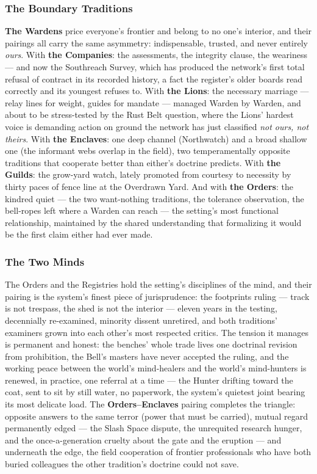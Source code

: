 \subsubsection{The Boundary Traditions}

\textbf{The Wardens} price everyone's frontier and belong to no one's interior, and their pairings all carry the same asymmetry: indispensable, trusted, and never entirely \textit{ours}. With \textbf{the Companies}: the assessments, the integrity clause, the weariness --- and now the Southreach Survey, which has produced the network's first total refusal of contract in its recorded history, a fact the register's older boards read correctly and its youngest refuses to. With \textbf{the Lions}: the necessary marriage --- relay lines for weight, guides for mandate --- managed Warden by Warden, and about to be stress-tested by the Rust Belt question, where the Lions' hardest voice is demanding action on ground the network has just classified \textit{not ours, not theirs}. With \textbf{the Enclaves}: one deep channel (Northwatch) and a broad shallow one (the informant webs overlap in the field), two temperamentally opposite traditions that cooperate better than either's doctrine predicts. With \textbf{the Guilds}: the grow-yard watch, lately promoted from courtesy to necessity by thirty paces of fence line at the Overdrawn Yard. And with \textbf{the Orders}: the kindred quiet --- the two want-nothing traditions, the tolerance observation, the bell-ropes left where a Warden can reach --- the setting's most functional relationship, maintained by the shared understanding that formalizing it would be the first claim either had ever made.

\subsubsection{The Two Minds}

The Orders and the Registries hold the setting's disciplines of the mind, and their pairing is the system's finest piece of jurisprudence: the footprints ruling --- track is not trespass, the shed is not the interior --- eleven years in the testing, decennially re-examined, minority dissent unretired, and both traditions' examiners grown into each other's most respected critics. The tension it manages is permanent and honest: the benches' whole trade lives one doctrinal revision from prohibition, the Bell's masters have never accepted the ruling, and the working peace between the world's mind-healers and the world's mind-hunters is renewed, in practice, one referral at a time --- the Hunter drifting toward the coat, sent to sit by still water, no paperwork, the system's quietest joint bearing its most delicate load. The \textbf{Orders--Enclaves} pairing completes the triangle: opposite answers to the same terror (power that must be carried), mutual regard permanently edged --- the Slash Space dispute, the unrequited research hunger, and the once-a-generation cruelty about the gate and the eruption --- and underneath the edge, the field cooperation of frontier professionals who have both buried colleagues the other tradition's doctrine could not save.

